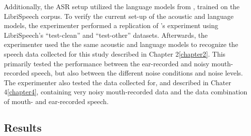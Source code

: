 \documentclass[dissertation,copyright]{uathesis}
\begin{document}
Additionally, the ASR setup utilized the language models from \cite{panayotov:15}, trained on the LibriSpeech corpus.  To verify the current set-up of the acoustic and language models, the experimenter performed a replication of \cite{panayotov:15}'s experiment using LibriSpeech's ``test-clean'' and ``test-other'' datasets.  Afterwards, the experimenter used the the same acoustic and language models to recognize the speech data collected for this study described in Chapter 2\ref{chapter2}. This primarily tested the performance between the ear-recorded and noisy mouth-recorded speech, but also between the different noise conditions and noise levels.  The experimenter also tested the data collected for, and described in Chater 4\ref{chapter4}, containing very noisy mouth-recorded data and the data combination of mouth- and ear-recorded speech.







\subsection{Results}
\end{document}
